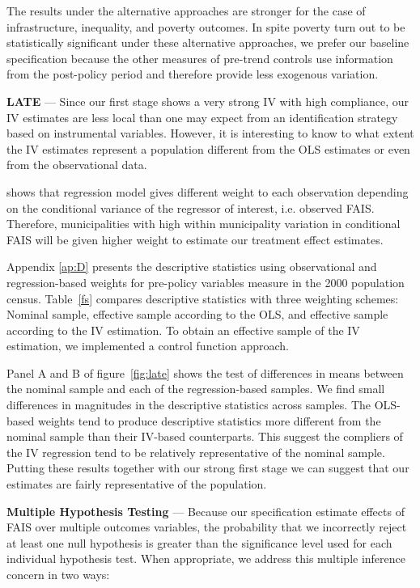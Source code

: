 \documentclass[dv_diss_main.tex]{subfiles}
\begin{document}
The results under the alternative approaches are stronger for the case of infrastructure, inequality, and poverty outcomes. In spite poverty turn out to be statistically significant under these alternative approaches, we prefer our baseline specification because the other measures of pre-trend controls use information from the post-policy period and therefore provide less exogenous variation.

\textbf{LATE }— Since our first stage shows a very strong IV with high compliance, our IV estimates are less local than one may expect from an identification strategy based on instrumental variables. However, it is interesting to know to what extent the IV estimates represent a population different from the OLS estimates or even from the observational data.

 \cite{aronow2016does} shows that regression model gives different weight to each observation depending on the conditional variance of the regressor of interest, i.e. observed FAIS. Therefore, municipalities with high within municipality variation in conditional FAIS will be given higher weight to estimate our treatment effect estimates. 

Appendix \ref{ap:D} presents the descriptive statistics using observational and regression-based weights for pre-policy variables measure in the 2000 population census. {Table}~\ref{fs} compares descriptive statistics with three weighting schemes: Nominal sample, effective sample according to the OLS, and effective sample according to the IV estimation. To obtain an effective sample of the IV estimation, we implemented a control function approach. 

Panel A and B of {figure}~\ref{fig:late} shows the test of differences in means between the nominal sample and each of the regression-based samples. We find small differences in magnitudes in the descriptive statistics across samples. The OLS-based weights tend to produce descriptive statistics more different from the nominal sample than their IV-based counterparts. This suggest the compliers of the IV regression tend to be relatively representative of the nominal sample. Putting these results together with our strong first stage we can suggest that our estimates are fairly representative of the population. 

\textbf{ Multiple Hypothesis Testing }— Because our specification estimate effects of FAIS over multiple outcomes variables, the probability that we incorrectly reject at least one null hypothesis is greater than the significance level used for each individual hypothesis test. When appropriate, we address this multiple inference concern in two ways:
\end{document}
